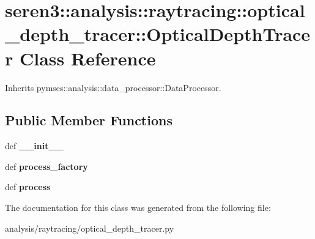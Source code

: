 \hypertarget{classseren3_1_1analysis_1_1raytracing_1_1optical__depth__tracer_1_1OpticalDepthTracer}{
\section{seren3::analysis::raytracing::optical\_\-depth\_\-tracer::OpticalDepthTracer Class Reference}
\label{classseren3_1_1analysis_1_1raytracing_1_1optical__depth__tracer_1_1OpticalDepthTracer}
}


Inherits pymses::analysis::data\_\-processor::DataProcessor.\subsection*{Public Member Functions}
\begin{DoxyCompactItemize}
\item 
\hypertarget{classseren3_1_1analysis_1_1raytracing_1_1optical__depth__tracer_1_1OpticalDepthTracer_a18079de77178d6ebf925a101a1580b1f}{
def {\bfseries \_\-\_\-init\_\-\_\-}}
\label{classseren3_1_1analysis_1_1raytracing_1_1optical__depth__tracer_1_1OpticalDepthTracer_a18079de77178d6ebf925a101a1580b1f}

\item 
\hypertarget{classseren3_1_1analysis_1_1raytracing_1_1optical__depth__tracer_1_1OpticalDepthTracer_a646b23d4a54aa3e2f729f3a2e17b5fff}{
def {\bfseries process\_\-factory}}
\label{classseren3_1_1analysis_1_1raytracing_1_1optical__depth__tracer_1_1OpticalDepthTracer_a646b23d4a54aa3e2f729f3a2e17b5fff}

\item 
\hypertarget{classseren3_1_1analysis_1_1raytracing_1_1optical__depth__tracer_1_1OpticalDepthTracer_afa4bf7d30583c39151449d0cec5d4f5b}{
def {\bfseries process}}
\label{classseren3_1_1analysis_1_1raytracing_1_1optical__depth__tracer_1_1OpticalDepthTracer_afa4bf7d30583c39151449d0cec5d4f5b}

\end{DoxyCompactItemize}


The documentation for this class was generated from the following file:\begin{DoxyCompactItemize}
\item 
analysis/raytracing/optical\_\-depth\_\-tracer.py\end{DoxyCompactItemize}
